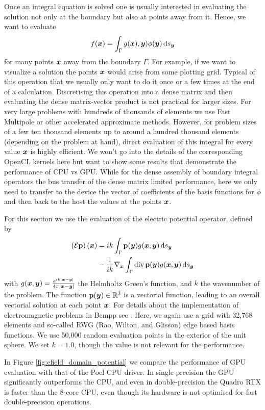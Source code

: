Once an integral equation is solved one is usually interested in evaluating the solution not only at the boundary but also at points away from it. Hence, we want to evaluate
$$
f(\bx) = \int_{\Gamma}g(\bx), \by)\phi(\by) \ds[\by]
$$
for many points $\boldsymbol{x}$ away from the boundary $\Gamma$. For example, if we want to visualize a solution the points $\boldsymbol{x}$ would arise from some plotting grid. Typical of this operation that we usually only want to do it once or a few times at the end of a calculation. Discretising this operation into a dense matrix and then evaluating the dense matrix-vector product is not practical for larger sizes. For very large problems with hundreds of thousands of elements we use Fast Multipole or other accelerated approximate methods. However, for problem sizes of a few ten thousand elements up to around a hundred thousand elements (depending on the problem at hand), direct evaluation of this integral for every value $\boldsymbol{x}$ is highly efficient. We won't go into the details of the corresponding OpenCL kernels here but want to show some results that demonstrate the performance of CPU vs GPU. While for the dense assembly of boundary integral operators the bus transfer of the dense matrix limited performance, here we only need to transfer to the device the vector of coefficients of the basis functions for $\phi$ and then back to the host the values at the points $\boldsymbol{x}$.

For this section we use the evaluation of the electric potential operator, defined by
\begin{align*}
\left(\mathcal{E\mathbf{p}}\right)(\bx) &= ik\int_{\Gamma}\mathbf{p}(\by)g(\bx, \by) \ds[\by]\nonumber\\
&-\frac{1}{ik}\nabla_{\bx}\int_{\Gamma}\text{div}\,\mathbf{p}(\by)g(\bx, \by)\ds[\by]
\end{align*}
with $g(\boldsymbol{x}, \boldsymbol{y}) = \frac{e^{ik|\boldsymbol{x} - \boldsymbol{y}|}}{4\pi|\boldsymbol{x} - \boldsymbol{y}|}$ the Helmholtz Green's function, and
$k$ the wavenumber of the problem.
The function $\mathbf{p}(\boldsymbol{y})\in\mathbb{R}^3$ is a vectorial function, leading to an overall vectorial solution at each point $\boldsymbol{x}$. For details about the implementation of electromagnetic problems in Bempp see \cite{bempp_maxwell}. Here, we again use a grid with 32,768 elements and so-called RWG (Rao, Wilton, and Glisson) edge based basis functions. We use 50,000 random evaluation points in the exterior of the unit sphere. We set $k=1.0$, though the value is not relevant for the performance.

In Figure \ref{fig:efield_domain_potential} we compare the performance of GPU evaluation with that of the Pocl CPU driver. In single-precision the GPU significantly outperforms the CPU, and even in double-precision the Quadro RTX is faster than the 8-core CPU, even though its hardware is not optimised for fast double-precision operations.

